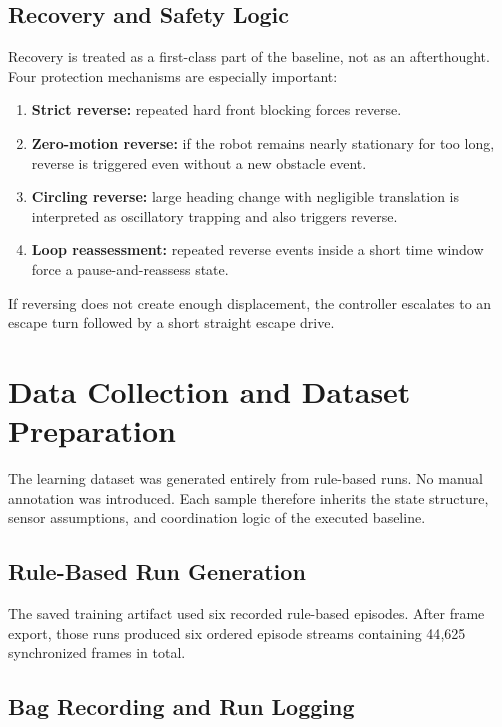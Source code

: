 \subsection{Recovery and Safety Logic}

Recovery is treated as a first-class part of the baseline, not as an afterthought. Four protection mechanisms are especially important:

\begin{enumerate}
\item \textbf{Strict reverse:} repeated hard front blocking forces reverse.
\item \textbf{Zero-motion reverse:} if the robot remains nearly stationary for too long, reverse is triggered even without a new obstacle event.
\item \textbf{Circling reverse:} large heading change with negligible translation is interpreted as oscillatory trapping and also triggers reverse.
\item \textbf{Loop reassessment:} repeated reverse events inside a short time window force a pause-and-reassess state.
\end{enumerate}

If reversing does not create enough displacement, the controller escalates to an escape turn followed by a short straight escape drive.

\section{Data Collection and Dataset Preparation}

The learning dataset was generated entirely from rule-based runs. No manual annotation was introduced. Each sample therefore inherits the state structure, sensor assumptions, and coordination logic of the executed baseline.

\subsection{Rule-Based Run Generation}

The saved training artifact used six recorded rule-based episodes. After frame export, those runs produced six ordered episode streams containing 44{,}625 synchronized frames in total.

\subsection{Bag Recording and Run Logging}

